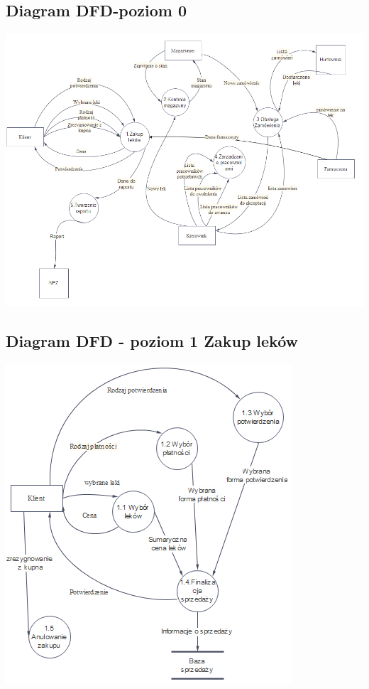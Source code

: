\documentclass[a4paper, 11pt]{article}
\begin{document}
	\subsection{Diagram DFD-poziom 0}
		\includegraphics[scale=0.7]{dfdpoziom1.PNG} 
	\subsection{Diagram DFD - poziom 1 Zakup leków}
		\includegraphics[scale=1]{zakupLekow2.PNG} 	
\end{document}
